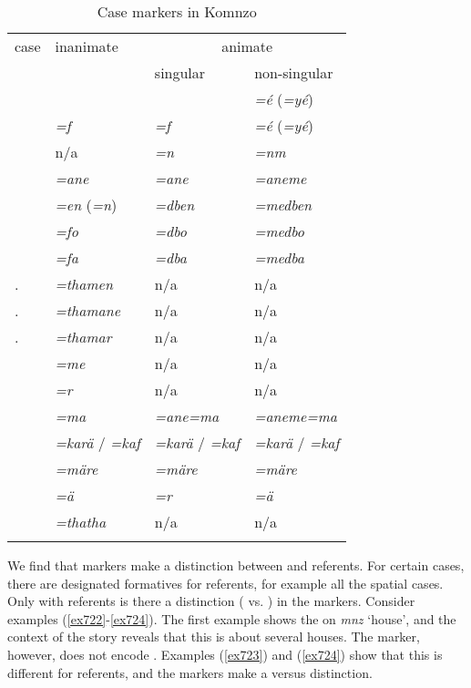 \begin{table} 
\caption{Case markers in Komnzo} 
\label{caseformatives}
	\begin{tabularx}{.8\textwidth}{Xlll}
		\lsptoprule
			{{case}}& {{inanimate}}&\multicolumn{2}{c}{{animate}}\\
			&&\multicolumn{1}{l}{{singular}}&\multicolumn{1}{l}{{non-singular}}\\ \midrule
			{\Abs}&\Zero{}&\Zero{}&\emph{=é} (\emph{=yé})\\
			{\Erg}&\emph{=f}&\emph{=f}&\emph{=é} (\emph{=yé})\\									
			{\Dat}&n/a&\emph{=n}&\emph{=nm}\\
			{\Poss}&\emph{=ane}&\emph{=ane}&\emph{=aneme}\\
			{\Loc}&\emph{=en} (\emph{=n})&\emph{=dben}& \emph{=medben}\\
			{\All}&\emph{=fo}&\emph{=dbo}& \emph{=medbo}\\
			{\Abl}&\emph{=fa}&\emph{=dba}& \emph{=medba}\\									
			\Temp.\Loc&\emph{=thamen}&n/a&n/a\\
			\Temp.\Poss&\emph{=thamane}&n/a&n/a\\
			\Temp.\Purp&\emph{=thamar}&n/a&n/a\\
			\Ins&\emph{=me}&n/a&n/a\\
			{\Purp}&\emph{=r}&n/a&n/a\\
			{\Char}&\emph{=ma}&\emph{=ane=ma}&\emph{=aneme=ma}\\
			{\Prop}&\emph{=karä} / \emph{=kaf}&\emph{=karä} / \emph{=kaf}&\emph{=karä} / \emph{=kaf}\\
			{\Priv}&\emph{=märe}&\emph{=märe}&\emph{=märe}\\
			{\Assoc}\super{a}&\emph{=ä}&\emph{=r}&\emph{=ä}\\
			\Simil&\emph{=thatha}&n/a&n/a\\
		\lspbottomrule
			\multicolumn{4}{l}{\footnotesize \super{a}The associative forms encode {\Du} versus {\Pl} (\S\ref{inclusorycontruction}).}
	\end{tabularx}
\end{table}%

We find that  markers make a distinction between  and  referents. For certain cases, there are designated formatives for  referents, for example all the spatial cases. Only with  referents is there a  distinction ({\Sg} vs. {\Nsg}) in the  markers. Consider examples (\ref{ex722}-\ref{ex724}). The first example shows the   on \emph{mnz} `house', and the context of the story reveals that this is about several houses. The  marker, however, does not encode . Examples (\ref{ex723}) and (\ref{ex724}) show that this is different for  referents, and the  markers make a  versus  distinction.

